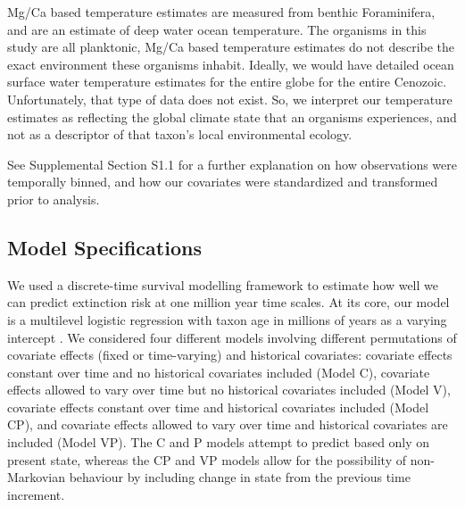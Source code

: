 \documentclass[12pt,letterpaper]{article}
\begin{document}
\begin{refsection}
Mg/Ca based temperature estimates are measured from benthic Foraminifera, and are an estimate of deep water ocean temperature. The organisms in this study are all planktonic, Mg/Ca based temperature estimates do not describe the exact environment these organisms inhabit. Ideally, we would have detailed ocean surface water temperature estimates for the entire globe for the entire Cenozoic. Unfortunately, that type of data does not exist. So, we interpret our temperature estimates as reflecting the global climate state that an organisms experiences, and not as a descriptor of that taxon's local environmental ecology.

See Supplemental Section S1.1 for a further explanation on how observations were temporally binned, and how our covariates were standardized and transformed prior to analysis.




\subsection{Model Specifications}

We used a discrete-time survival modelling framework to estimate how well we can predict extinction risk at one million year time scales. At its core, our model is a multilevel logistic regression with taxon age in millions of years as a varying intercept \citep{Tutz2016}. We considered four different models involving different permutations of covariate effects (fixed or time-varying) and historical covariates: covariate effects constant over time and no historical covariates included (Model C), covariate effects allowed to vary over time but no historical covariates included (Model V), covariate effects constant over time and historical covariates included (Model CP), and covariate effects allowed to vary over time and historical covariates are included (Model VP). The C and P models attempt to predict based only on present state, whereas the CP and VP models allow for the possibility of non-Markovian behaviour by including change in state from the previous time increment.


\end{refsection}
\end{document}

